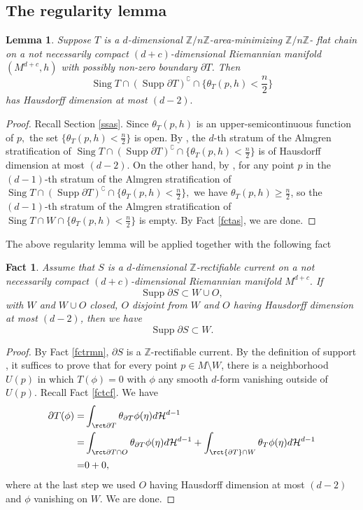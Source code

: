 \documentclass[11pt,a4paper]{amsart}
\numberwithin{equation}{section}
\newcommand{\supp}{\operatorname{Supp}}
\newcommand{\sing}{\operatorname{Sing}}
\newcommand{\ta}{\theta}
\newcommand{\s}{\subset}
\newcommand{\cp}{^\complement}
\newcommand{\pd}{\partial}
\newcommand{\Z}{\mathbb{Z}}
\theoremstyle{plain}
\newtheorem{lem}{Lemma}[subsection]
\newtheorem{fact}{Fact}[subsection]
\theoremstyle{definition}
\numberwithin{equation}{subsection}
\begin{document}
	\subsection{The regularity lemma}
	\begin{lem}\label{lemsingt}
	Suppose $T$ is a $d$-dimensional  $\Z/n\Z$-area-minimizing $\Z/n\Z$-	flat chain on a not necessarily compact $(d+c)$-dimensional Riemannian manifold $(M^{d+c},h)$ with possibly non-zero boundary $\pd T$.	Then	$$\sing T\cap (\supp\pd T)\cp\cap \{\ta_T(p,h)<\frac{n}{2}\}$$ has Hausdorff dimension at most $(d-2).$
	\end{lem}
	\begin{proof}
		Recall Section \ref{ssas}. Since $\ta_T(p,h)$ is an upper-semicontinuous function of $p,$ the set $\{\ta_T(p,h)<\frac{n}{2}\}$ is open. By \cite[Theorem 1.7]{DHMS}, the $d$-th stratum of the Almgren stratification of $\sing T\cap (\supp\pd T)\cp\cap \{\ta_T(p,h)<\frac{n}{2}\}$ is of Hausdorff dimension at most $(d-2)$. On the other hand, by \cite[Lemma 8.6]{DHMS}, for any point $p$ in the $(d-1)$-th stratum of the Almgren stratification of $\sing T\cap (\supp\pd T)\cp\cap \{\ta_T(p,h)<\frac{n}{2}\},$ we have $\ta_T(p,h)\ge\frac{n}{2}$, so the $(d-1)$-th stratum of the Almgren stratification of $\sing T\cap W\cap \{\ta_T(p,h)<\frac{n}{2}\}$ is empty. By Fact \ref{fctas}, we are done.
	\end{proof}
	The above regularity lemma will be applied together with the following fact
	\begin{fact}\label{fctbd}
Assume that $S$ is a $d$-dimensional $\Z$-rectifiable current on a not necessarily compact $(d+c)$-dimensional Riemannian manifold $M^{d+c}.$ If $$\supp\pd S\s W\cup O,$$ with $W$ and $W\cup O$ closed, $O$ disjoint from $W$ and $O$ having Hausdorff dimension at most $(d-2)$, then we have $$\supp \pd S\s W.$$ 
	\end{fact}
	\begin{proof}By Fact \ref{fctrmn}, $\pd S$ is a $\Z$-rectifiable current.
 By the definition of support \cite[Section 4.1.1 p.344]{HF}, it suffices to prove that for every point $p\in M\setminus W$, there is a neighborhood $U(p)$ in which $T(\phi)=0$ with $\phi$ any smooth $d$-form vanishing outside of $U(p).$ Recall Fact \ref{fctcf}. We have
\begin{align*}
	\pd T(\phi)=&\int_{\rct \pd T}\theta_{\pd T}\phi(\eta)d\mathcal{H}^{d-1}\\
	=&\int_{\rct \pd T\cap O}\theta_{\pd T}\phi(\eta)d\mathcal{H}^{d-1}+\int_{\rct  {\pd T}\cap W}\theta_T\phi(\eta)d\mathcal{H}^{d-1}\\
	=&0+0,
\end{align*}
 where at the last step we used $O$ having Hausdorff dimension at most $(d-2)$ and $\phi$ vanishing on $W$. We are done.
	\end{proof}
\end{document}
